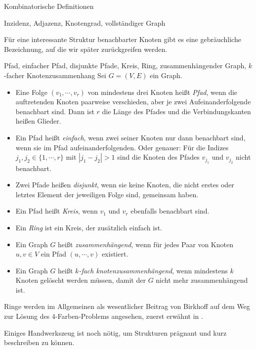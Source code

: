 \begin{section}{Kombinatorische Definitionen}
\begin{definition}{Inzidenz, Adjazenz, Knotengrad, vollständiger Graph}
\begin{itemize}
   \end{itemize}
  \end{definition}
    
  Für eine interessante Struktur benachbarter Knoten gibt es eine gebräuchliche Bezeichnung, auf die wir später zurückgreifen werden.
  
  \begin{definition}{Pfad, einfacher Pfad, disjunkte Pfade, Kreis, Ring, zusammenhängender Graph, $k$-facher Knotenzusammenhang}
  Sei $G=(V,E)$ ein Graph.
   \begin{itemize}
    \item Eine Folge $(v_1,\cdots,v_r)$ von mindestens drei Knoten heißt \textit{Pfad}, wenn die auftretenden Knoten paarweise verschieden, aber je zwei Aufeinanderfolgende benachbart sind. Dann ist $r$ die Länge des Pfades und die Verbindungskanten heißen Glieder.
    \item Ein Pfad heißt \textit{einfach}, wenn zwei seiner Knoten nur dann benachbart sind, wenn sie im Pfad aufeinanderfolgenden. Oder genauer: Für die Indizes $j_1, j_2 \in \{1,\cdots,r\}$ mit $|j_1 - j_2| > 1$ sind die Knoten des Pfades $v_{j_1}$ und $v_{j_2}$ nicht benachbart.
    \item Zwei Pfade heißen \textit{disjunkt}, wenn sie keine Knoten, die nicht erstes oder letztes Element der jeweiligen Folge sind, gemeinsam haben. 
    \item Ein Pfad heißt \textit{Kreis}, wenn $v_1$ und $v_r$ ebenfalls benachbart sind.
    \item Ein \textit{Ring} ist ein Kreis, der zusätzlich einfach ist.
    \item Ein Graph $G$ heißt \textit{zusammenhängend}, wenn für jedes Paar von Knoten $u,v \in V$ ein Pfad $(u,\cdots,v)$ existiert.
    \item Ein Graph $G$ heißt \textit{$k$-fach knotenzusammenhängend}, wenn mindestens $k$ Knoten gelöscht werden müssen, damit der $G$ nicht mehr zusammenhängend ist.
   \end{itemize}
  \end{definition}
  
  Ringe werden im Allgemeinen als wesentlicher Beitrag von Birkhoff auf dem Weg zur Lösung des 4-Farben-Problems angesehen, zuerst erwähnt in \cite{AmJMath35}.

  Einiges Handwerkszeug ist noch nötig, um Strukturen prägnant und kurz beschreiben zu können.
  

\end{section}
